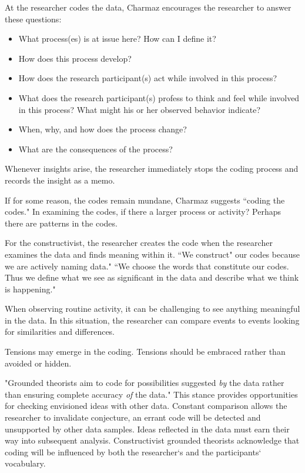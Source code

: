 At the researcher codes the data, Charmaz encourages the researcher to answer these questions:
\begin{itemize}
\item What process(es) is at issue here? How can I define it?
\item How does this process develop?
\item How does the research participant(s) act while involved in this process?
\item What does the research participant(s) profess to think and feel while involved in this process? What might his or her observed behavior indicate?
\item When, why, and how does the process change?
\item What are the consequences of the process?
\end{itemize}

Whenever insights arise, the researcher immediately stops the coding process and records the insight as a memo.

If for some reason, the codes remain mundane, Charmaz suggests ``coding the codes." In examining the codes, if there a larger process or activity? Perhaps there are patterns in the codes. 

For the constructivist, the researcher creates the code when the researcher examines the data and finds meaning within it. ``We construct" our codes because we are actively naming data." ``We choose the words that constitute our codes. Thus we define what we see as significant in the data and describe what we think is happening."

When observing routine activity, it can be challenging to see anything meaningful in the data. In this situation, the researcher can compare events to events looking for similarities and differences. 

Tensions may emerge in the coding. Tensions should be embraced rather than avoided or hidden. 

"Grounded theorists aim to code for possibilities suggested \textit{by} the data rather than ensuring complete accuracy \textit{of} the data." This stance provides opportunities for checking envisioned ideas with other data. Constant comparison allows the researcher to invalidate conjecture, an errant code will be detected and unsupported by other data samples. Ideas reflected in the data must earn their way into subsequent analysis. Constructivist grounded theorists acknowledge that coding will be influenced by both the researcher`s and the participants` vocabulary.

